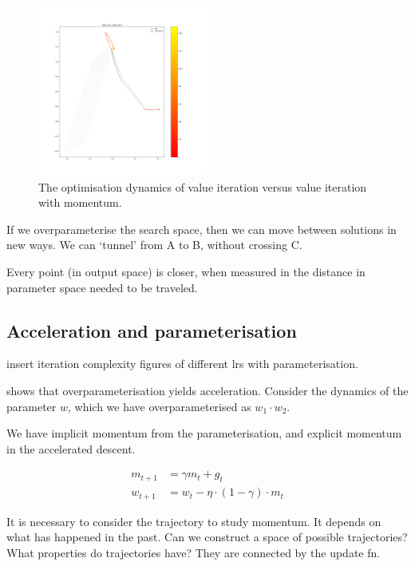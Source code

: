\begin{figure}
\centering
\includegraphics[width=0.5\textwidth,height=0.5\textheight]{../../pictures/figures/vi_sgd-vs-vi_mom.png}
\caption{The optimisation dynamics of value iteration versus value iteration with momentum.}
\end{figure}

If we overparameterise the search space, then we can move between solutions in new ways. We can `tunnel' from A to B, without crossing C.

Every point (in output space) is closer, when measured in the distance in parameter space needed to be traveled.


\subsection{Acceleration and parameterisation}

{\color{red}insert iteration complexity figures of different lrs with parameterisation.}

\cite{Arora2018} shows that overparameterisation yields acceleration. Consider
the dynamics of the parameter $w$, which we have overparameterised as $w_1 \cdot w_2$.



We have implicit momentum from the parameterisation, and explicit momentum in the accelerated descent.


\begin{align}
m_{t+1} &= \gamma m_t + g_t \\
w_{t+1} &= w_t - \eta \cdot (1-\gamma) \cdot m_t
\end{align}

It is necessary to consider the trajectory to study momentum. It depends
on what has happened in the past. Can we construct a space of possible
trajectories? What properties do trajectories have? They are connected
by the update fn.


